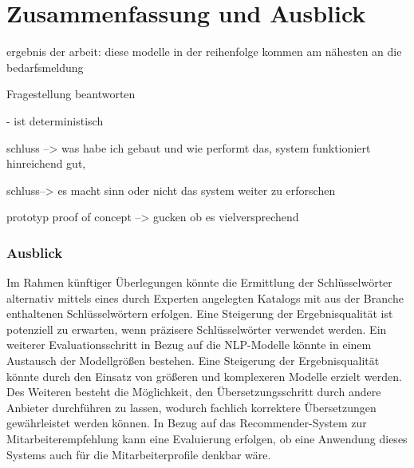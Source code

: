 \chapter{Zusammenfassung und Ausblick}
\label{chap:ergebnisseausblick}

ergebnis der arbeit: diese modelle in der reihenfolge kommen am nähesten an die bedarfsmeldung

Fragestellung beantworten

- ist deterministisch

schluss --> was habe ich gebaut und wie performt das, system funktioniert hinreichend gut,

schluss--> es macht sinn oder nicht das system weiter zu erforschen

prototyp proof of concept --> gucken ob es vielversprechend



\subsection*{Ausblick}
Im Rahmen künftiger Überlegungen könnte die Ermittlung der Schlüsselwörter alternativ mittels eines durch Experten angelegten Katalogs mit aus der Branche enthaltenen Schlüsselwörtern erfolgen. Eine Steigerung der Ergebnisqualität ist potenziell zu erwarten, wenn präzisere Schlüsselwörter verwendet werden. Ein weiterer Evaluationsschritt in Bezug auf die NLP-Modelle könnte in einem Austausch der Modellgrößen bestehen. Eine Steigerung der Ergebnisqualität könnte durch den Einsatz von größeren und komplexeren Modelle erzielt werden. Des Weiteren besteht die Möglichkeit, den Übersetzungsschritt durch andere Anbieter durchführen zu lassen, wodurch fachlich korrektere Übersetzungen gewährleistet werden können. In Bezug auf das Recommender-System zur Mitarbeiterempfehlung kann eine Evaluierung erfolgen, ob eine Anwendung dieses Systems auch für die Mitarbeiterprofile denkbar wäre.
\newpage
